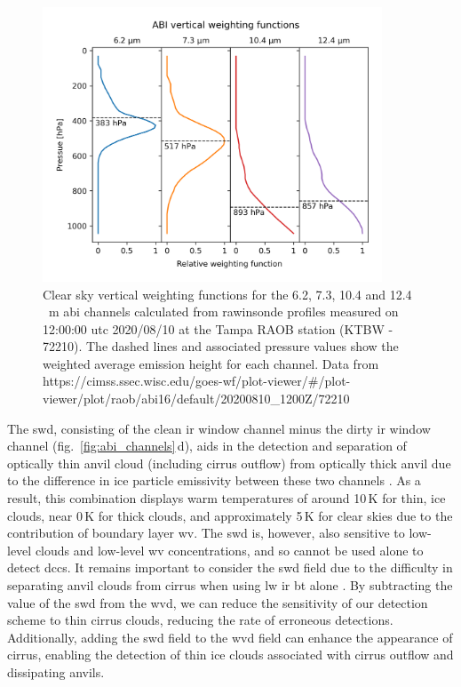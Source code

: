 \begin{figure}[tp]
    \includegraphics[width=0.9\textwidth]{figures/chapter1_04.png}
    \caption[
    Clear sky vertical weighting functions for the 6.2, 7.3, 10.4 and 12.4\,\unit{\mu m} \acrshort{abi} channels
    ]{
    Clear sky vertical weighting functions for the 6.2, 7.3, 10.4 and 12.4\,\unit{\mu m} \acrshort{abi} channels calculated from rawinsonde profiles measured on 12:00:00 \acrshort{utc} 2020/08/10 at the Tampa RAOB station (KTBW - 72210). The dashed lines and associated pressure values show the weighted average emission height for each channel. Data from {https://cimss.ssec.wisc.edu/goes-wf/plot-viewer/\#/plot-viewer/plot/raob/abi16/default/20200810\_1200Z/72210}
    }
    \label{fig:abi_vertical_weighting}
\end{figure}

The \acrfull{swd}, consisting of the clean \acrshort{ir} window channel minus the dirty \acrshort{ir} window channel (fig.~\ref{fig:abi_channels}\,d), aids in the detection and separation of optically thin anvil cloud (including cirrus outflow) from optically thick anvil due to the difference in ice particle emissivity between these two channels \citep{heidinger_gazing_2009}.
As a result, this combination displays warm temperatures of around 10\,\unit{K} for thin, ice clouds, near 0\,\unit{K} for thick clouds, and approximately 5\,\unit{K} for clear skies due to the contribution of boundary layer \acrshort{wv}.
The \acrshort{swd} is, however, also sensitive to low-level clouds and low-level \acrshort{wv} concentrations, and so cannot be used alone to detect \acrshort{dcc}s.
It remains important to consider the \acrshort{swd} field due to the difficulty in separating anvil clouds from cirrus when using \acrshort{lw} \acrshort{ir} \acrshort{bt} alone \citep{hong_detection_2005}. 
By subtracting the value of the \acrshort{swd} from the \acrshort{wvd}, we can reduce the sensitivity of our detection scheme to thin cirrus clouds, reducing the rate of erroneous detections.
Additionally, adding the \acrshort{swd} field to the \acrshort{wvd} field can enhance the appearance of cirrus, enabling the detection of thin ice clouds associated with cirrus outflow and dissipating anvils.

